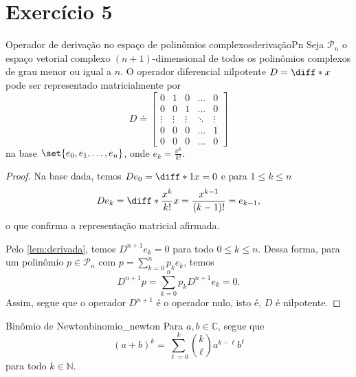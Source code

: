 \section*{Exercício 5}
\begin{proposition}{Operador de derivação no espaço de polinômios complexos}{derivaçãoPn}
    Seja \(\mathcal{P}_n\) o espaço vetorial complexo \((n + 1)\)-dimensional de todos os polinômios complexos de grau menor ou igual a \(n\). O operador diferencial nilpotente \(D = \diff*{}{x}\) pode ser representado matricialmente por
    \begin{equation*}
        D \doteq \begin{bmatrix}
            0 & 1 & 0 & \dots & 0\\
            0 & 0 & 1 & \dots & 0\\
            \vdots & \vdots & \vdots & \ddots & \vdots\\
            0 & 0 & 0 & \dots & 1\\
            0 & 0 & 0 & \dots & 0
        \end{bmatrix}
    \end{equation*}
    na base \(\set{e_0, e_1, \dots, e_n}\), onde \(e_k = \frac{x^k}{k!}\).
\end{proposition}
\begin{proof}
    Na base dada, temos \(D e_0 = \diff*{1}{x} = 0\) e para \(1 \leq k \leq n\)
    \begin{equation*}
        D e_k = \diff*{\frac{x^k}{k!}}{x} = \frac{x^{k-1}}{(k-1)!} = e_{k-1},
    \end{equation*}
    o que confirma a representação matricial afirmada.

    Pelo \cref{lem:derivada}, temos \(D^{n+1}e_k = 0\) para todo \(0 \leq k \leq n\). Dessa forma, para um polinômio \(p \in \mathcal{P}_n\) com \(p = \sum_{k = 0}^{n} p_k e_k\), temos
    \begin{equation*}
        D^{n+1} p = \sum_{k=0}^n p_k D^{n+1} e_k = 0.
    \end{equation*}
    Assim, segue que o operador \(D^{n+1}\) é o operador nulo, isto é, \(D\) é nilpotente.
\end{proof}
\begin{lemma}{Binômio de Newton}{binomio_newton}
    Para \(a,b \in \mathbb{C}\), segue que
    \begin{equation*}
        (a + b)^k = \sum_{\ell = 0}^{k} \binom{k}{\ell} a^{k - \ell}b^{\ell}
    \end{equation*}
    para todo \(k \in \mathbb{N}\).
\end{lemma}
